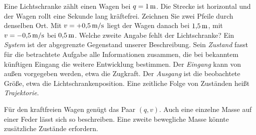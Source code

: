 
Eine Lichtschranke zählt einen Wagen bei \(q=1\,\mathrm{m}\). Die Strecke ist horizontal und der Wagen rollt eine Sekunde lang kräftefrei. Zeichnen Sie zwei Pfeile durch denselben Ort. Mit \(v=+0{,}5\,\mathrm{m/s}\) liegt der Wagen danach bei \(1{,}5\,\mathrm{m}\), mit \(v=-0{,}5\,\mathrm{m/s}\) bei \(0{,}5\,\mathrm{m}\). Welche zweite Angabe fehlt der Lichtschranke?
Ein \emph{System} ist der abgegrenzte Gegenstand unserer Beschreibung. Sein \emph{Zustand} fasst für die betrachtete Aufgabe alle Informationen zusammen, die bei bekanntem künftigen Eingang die weitere Entwicklung bestimmen. Der \emph{Eingang} kann von außen vorgegeben werden, etwa die Zugkraft. Der \emph{Ausgang} ist die beobachtete Größe, etwa die Lichtschrankenposition. Eine zeitliche Folge von Zuständen heißt \emph{Trajektorie}.

Für den kraftfreien Wagen genügt das Paar \((q,v)\). Auch eine einzelne Masse auf einer Feder lässt sich so beschreiben. Eine zweite bewegliche Masse könnte zusätzliche Zustände erfordern.

